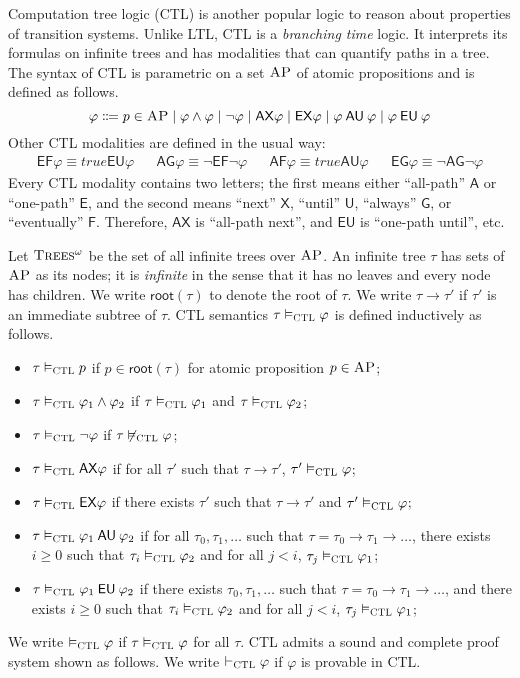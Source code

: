 \documentclass[acmsmall,review,anonymous]{acmart}
\newcommand{\AP}{\textsc{AP}}
\newcommand{\true}{\mathit{true}}
\newcommand{\AAA}{{\mathsf{A}}}
\newcommand{\EEE}{{\mathsf{E}}}
\newcommand{\XX}{{\mathsf{X}}}
\newcommand{\UU}{\mathbin{\mathsf{U}}}
\newcommand{\FF}{{\mathsf{F}}}
\newcommand{\GG}{{\mathsf{G}}}
\newcommand{\AG}{{\mathsf{AG}}}
\newcommand{\EG}{{\mathsf{EG}}}
\newcommand{\AF}{{\mathsf{AF}}}
\newcommand{\EF}{{\mathsf{EF}}}
\newcommand{\AX}{\mathsf{AX}}
\newcommand{\AU}{\mathbin{\mathsf{AU}}}
\newcommand{\EU}{\mathbin{\mathsf{EU}}}
\newcommand{\EX}{\mathsf{EX}}
\newcommand{\rt}{\mathsf{root}}
\newcommand{\infTrees}{\textsc{Trees$^\omega$}\xspace}
\newcommand{\CTL}{{\textsc{CTL}}}
\begin{document}
Computation tree logic (CTL) is another popular logic
to reason about properties of transition systems.
Unlike LTL, CTL is a \emph{branching time} logic.
It interprets its formulas on infinite trees
and has modalities that can quantify paths in a tree.
The syntax of CTL is parametric on a set $\AP$ of atomic propositions and
is defined as follows.
$$
\varphi \Coloneqq p \in \AP \mid
\varphi \wedge \varphi \mid
\neg \varphi \mid
\AX \varphi \mid
\EX \varphi \mid
\varphi \AU \varphi \mid
\varphi \EU \varphi
$$
Other CTL modalities are defined in the usual way:
\begin{align*}
\EF \varphi \equiv \true \EU \varphi &&
\AG \varphi \equiv \neg \EF \neg \varphi &&
\AF \varphi \equiv \true \AU \varphi &&
\EG \varphi \equiv \neg \AG \neg \varphi
\end{align*}
Every CTL modality contains two letters;
the first means either ``all-path'' $\AAA$ or ``one-path'' $\EEE$,
and the second means ``next'' $\XX$, ``until'' $\UU$, ``always'' $\GG$,
or ``eventually'' $\FF$.
Therefore, $\AX$ is ``all-path next'', and $\EU$ is ``one-path until'', etc.

Let $\infTrees$ be the set of all infinite trees over $\AP$.
An infinite tree $\tau$ has sets of $\AP$ as its nodes;
it is \emph{infinite} in the sense that it has no leaves
and every node has children.
We write $\rt(\tau)$ to denote the root of $\tau$.
We write $\tau \to \tau'$ 
if $\tau'$ is an immediate subtree of $\tau$.
CTL semantics $\tau \vDash_\CTL \varphi$ is defined inductively as follows.
\begin{itemize}
\item $\tau \vDash_\CTL p$ if $p \in \rt(\tau)$ for atomic proposition $p \in \AP$;
\item $\tau \vDash_\CTL \varphi_1 \wedge \varphi_2$ if
      $\tau \vDash_\CTL \varphi_1$ and $\tau \vDash_\CTL \varphi_2$;
\item $\tau \vDash_\CTL \neg \varphi$ if
      $\tau \not\vDash_\CTL \varphi$;
\item $\tau \vDash_\CTL \AX \varphi$ if
      for all $\tau'$ such that $\tau \to \tau'$, $\tau' \vDash_\CTL \varphi$;
\item $\tau \vDash_\CTL \EX \varphi$ if
	  there exists $\tau'$ such that $\tau \to \tau'$ and $\tau' \vDash_\CTL \varphi$;
\item $\tau \vDash_\CTL \varphi_1 \AU \varphi_2$ if
      for all $\tau_0,\tau_1,\dots$ such that
      $\tau = \tau_0 \to \tau_1 \to \dots$,
      there exists $i \ge 0$ such that
      $\tau_i \vDash_\CTL \varphi_2$
      and for all $j < i$, $\tau_j \vDash_\CTL \varphi_1$;
\item $\tau \vDash_\CTL \varphi_1 \EU \varphi_2$ if
      there exists $\tau_0,\tau_1,\dots$ such that
      $\tau = \tau_0 \to \tau_1 \to \dots$, and
      there exists $i \ge 0$ such that
      $\tau_i \vDash_\CTL \varphi_2$
      and for all $j < i$, $\tau_j \vDash_\CTL \varphi_1$;
\end{itemize}
We write $\vDash_\CTL \varphi$ if $\tau \vDash_\CTL\varphi$ for all $\tau$.
CTL admits a sound and complete proof system shown as follows.
We write $\vdash_\CTL\varphi$ if $\varphi$ is provable in CTL.
\end{document}
